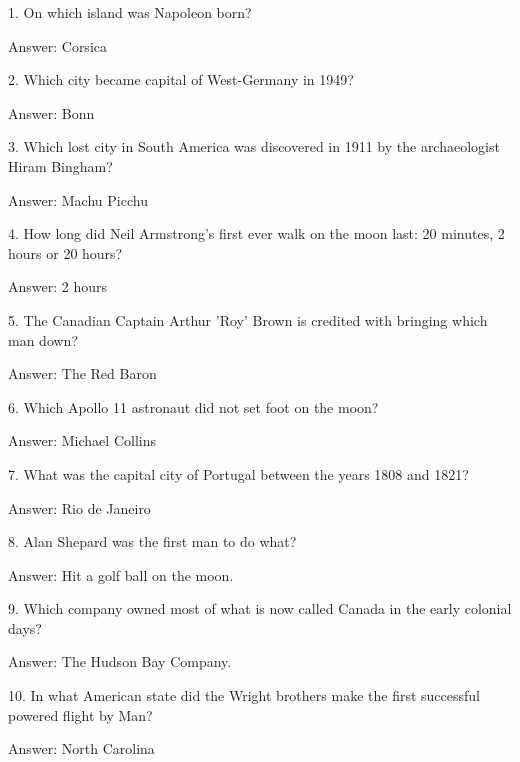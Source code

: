 \documentclass{beamer}
\begin{document}
    \begin{frame}
        1. On which island was Napoleon born?

        Answer: Corsica
    \end{frame}

    \begin{frame}
        2. Which city became capital of West-Germany in 1949?

        Answer: Bonn
    \end{frame}

    \begin{frame}
        3. Which lost city in South America was discovered in 1911 by the
        archaeologist Hiram Bingham?

        Answer: Machu Picchu
    \end{frame}

    \begin{frame}
        4. How long did Neil Armstrong’s first ever walk on the moon last: 20
        minutes, 2 hours or 20 hours?

        Answer: 2 hours
    \end{frame}

    \begin{frame}
        5. The Canadian Captain Arthur 'Roy' Brown is credited with bringing
        which man down?

        Answer: The Red Baron
    \end{frame}

    \begin{frame}
        6. Which Apollo 11 astronaut did not set foot on the moon?

        Answer: Michael Collins
    \end{frame}

    \begin{frame}
        7. What was the capital city of Portugal between the years 1808 and
        1821?

        Answer: Rio de Janeiro
    \end{frame}

    \begin{frame}
        8. Alan Shepard was the first man to do what?

        Answer: Hit a golf ball on the moon.
    \end{frame}

    \begin{frame}
        9.  Which company owned most of what is now called Canada in the early
        colonial days?

        Answer: The Hudson Bay Company.
    \end{frame}

    \begin{frame}
        10. In what American state did the Wright brothers make the first
        successful powered flight by Man?

        Answer: North Carolina
    \end{frame}
\end{document}
